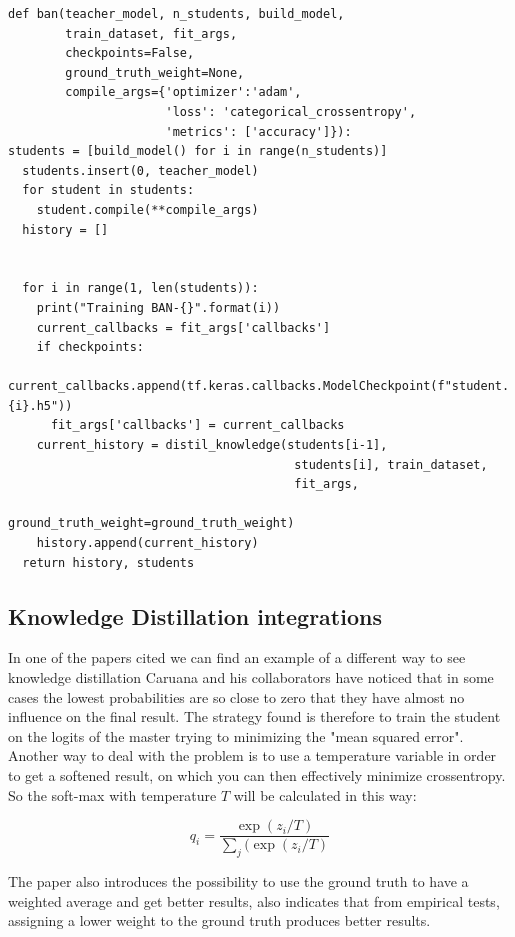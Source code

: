 \begin{lstlisting}
def ban(teacher_model, n_students, build_model, 
        train_dataset, fit_args,
        checkpoints=False,
        ground_truth_weight=None,
        compile_args={'optimizer':'adam', 
                      'loss': 'categorical_crossentropy', 
                      'metrics': ['accuracy']}):
students = [build_model() for i in range(n_students)]
  students.insert(0, teacher_model)
  for student in students:
    student.compile(**compile_args)
  history = []


  for i in range(1, len(students)):
    print("Training BAN-{}".format(i))
    current_callbacks = fit_args['callbacks']
    if checkpoints:
      current_callbacks.append(tf.keras.callbacks.ModelCheckpoint(f"student.{i}.h5"))
      fit_args['callbacks'] = current_callbacks
    current_history = distil_knowledge(students[i-1], 
                                        students[i], train_dataset,
                                        fit_args,
                                        ground_truth_weight=ground_truth_weight)   
    history.append(current_history)
  return history, students

\end{lstlisting}

\subsection{Knowledge Distillation integrations}
In one of the papers cited we can find an example of a different way to see knowledge distillation\cite{kd} Caruana and his collaborators have noticed that in some cases the lowest probabilities are so close to zero that they have almost no influence on the final result\cite{conf}. The strategy found is therefore to train the student on the logits of the master trying to minimizing the "mean squared error".\\
Another way to deal with the problem is to use a temperature variable in order to get a softened result, on which you can then effectively minimize crossentropy. So the soft-max with temperature $T$ will be calculated in this way:

\begin{equation}
q_i = \frac{\exp(z_i/T)}{\sum_j(\exp(z_i/T)}
\end{equation}

The paper\cite{kd} also introduces the possibility to use the ground truth to have a weighted average and get better results, also indicates that from empirical tests, assigning a lower weight to the ground truth produces better results.
\newpage
